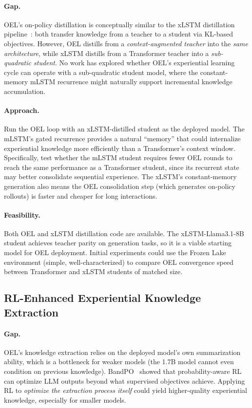 \documentclass[11pt]{article}
\begin{document}
\paragraph{Gap.}
OEL's on-policy distillation is conceptually similar to the xLSTM distillation pipeline~\cite{xlstm-distill}: both transfer knowledge from a teacher to a student via KL-based objectives.
However, OEL distills from a \emph{context-augmented teacher} into the \emph{same architecture}, while xLSTM distills from a Transformer teacher into a \emph{sub-quadratic student}.
No work has explored whether OEL's experiential learning cycle can operate with a sub-quadratic student model, where the constant-memory mLSTM recurrence might naturally support incremental knowledge accumulation.

\paragraph{Approach.}
Run the OEL loop with an xLSTM-distilled student as the deployed model.
The mLSTM's gated recurrence provides a natural ``memory'' that could internalize experiential knowledge more efficiently than a Transformer's context window.
Specifically, test whether the mLSTM student requires fewer OEL rounds to reach the same performance as a Transformer student, since its recurrent state may better consolidate sequential experience.
The xLSTM's constant-memory generation also means the OEL consolidation step (which generates on-policy rollouts) is faster and cheaper for long interactions.

\paragraph{Feasibility.}
Both OEL and xLSTM distillation code are available.
The xLSTM-Llama3.1-8B student achieves teacher parity on generation tasks, so it is a viable starting model for OEL deployment.
Initial experiments could use the Frozen Lake environment (simple, well-characterized) to compare OEL convergence speed between Transformer and xLSTM students of matched size.

\subsection{RL-Enhanced Experiential Knowledge Extraction}

\paragraph{Gap.}
OEL's knowledge extraction relies on the deployed model's own summarization ability, which is a bottleneck for weaker models (the 1.7B model cannot even condition on previous knowledge).
BandPO~\cite{bandpo} showed that probability-aware RL can optimize LLM outputs beyond what supervised objectives achieve.
Applying RL to \emph{optimize the extraction process itself} could yield higher-quality experiential knowledge, especially for smaller models.
\end{document}
